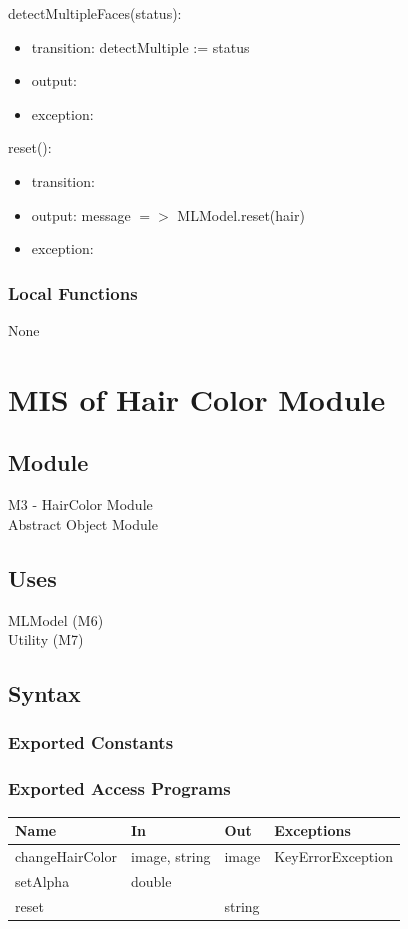 \documentclass[12pt, titlepage]{article}
\begin{document}
\noindent detectMultipleFaces(status):
\begin{itemize}
\item transition: detectMultiple := status
\item output: 
\item exception: 
\end{itemize}

\noindent reset():
\begin{itemize}
\item transition: 
\item output: message $=>$ MLModel.reset(hair)
\item exception: 
\end{itemize}

\subsubsection{Local Functions}
None

\newpage
\section{MIS of Hair Color Module}
\subsection{Module}
M3 - HairColor Module\\
Abstract Object Module

\subsection{Uses}
MLModel (M6) \\
Utility (M7)

\subsection{Syntax}

\subsubsection{Exported Constants}
\subsubsection{Exported Access Programs}

\begin{center}
\begin{tabular}{p{4cm} p{3cm} p{4cm} p{4cm}}
\hline
\textbf{Name} & \textbf{In} & \textbf{Out} & \textbf{Exceptions} \\
\hline
changeHairColor & image, string & image & KeyErrorException \\
setAlpha & double & & \\
reset & & string & \\
\hline
\end{tabular}
\end{center}
\end{document}
